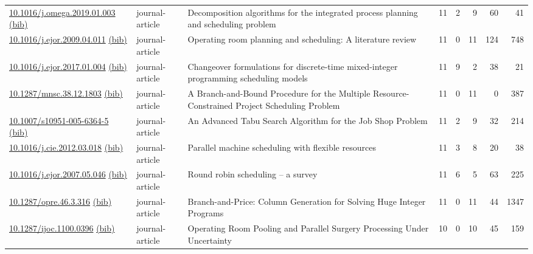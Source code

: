{\begin{longtable}{p{5cm}lp{11cm}rrrrr}
\href{http://dx.doi.org/10.1016/j.omega.2019.01.003}{10.1016/j.omega.2019.01.003} \href{https://www.doi2bib.org/bib/10.1016/j.omega.2019.01.003}{(bib)} & journal-article & Decomposition algorithms for the integrated process planning and scheduling problem & 11 & 2 & 9 & 60 & 41 \\
\href{http://dx.doi.org/10.1016/j.ejor.2009.04.011}{10.1016/j.ejor.2009.04.011} \href{https://www.doi2bib.org/bib/10.1016/j.ejor.2009.04.011}{(bib)} & journal-article & Operating room planning and scheduling: A literature review & 11 & 0 & 11 & 124 & 748 \\
\href{http://dx.doi.org/10.1016/j.ejor.2017.01.004}{10.1016/j.ejor.2017.01.004} \href{https://www.doi2bib.org/bib/10.1016/j.ejor.2017.01.004}{(bib)} & journal-article & Changeover formulations for discrete-time mixed-integer programming scheduling models & 11 & 9 & 2 & 38 & 21 \\
\href{http://dx.doi.org/10.1287/mnsc.38.12.1803}{10.1287/mnsc.38.12.1803} \href{https://www.doi2bib.org/bib/10.1287/mnsc.38.12.1803}{(bib)} & journal-article & A Branch-and-Bound Procedure for the Multiple Resource-Constrained Project Scheduling Problem & 11 & 0 & 11 & 0 & 387 \\
\href{http://dx.doi.org/10.1007/s10951-005-6364-5}{10.1007/s10951-005-6364-5} \href{https://www.doi2bib.org/bib/10.1007/s10951-005-6364-5}{(bib)} & journal-article & An Advanced Tabu Search Algorithm for the Job Shop Problem & 11 & 2 & 9 & 32 & 214 \\
\href{http://dx.doi.org/10.1016/j.cie.2012.03.018}{10.1016/j.cie.2012.03.018} \href{https://www.doi2bib.org/bib/10.1016/j.cie.2012.03.018}{(bib)} & journal-article & Parallel machine scheduling with flexible resources & 11 & 3 & 8 & 20 & 38 \\
\href{http://dx.doi.org/10.1016/j.ejor.2007.05.046}{10.1016/j.ejor.2007.05.046} \href{https://www.doi2bib.org/bib/10.1016/j.ejor.2007.05.046}{(bib)} & journal-article & Round robin scheduling – a survey & 11 & 6 & 5 & 63 & 225 \\
\href{http://dx.doi.org/10.1287/opre.46.3.316}{10.1287/opre.46.3.316} \href{https://www.doi2bib.org/bib/10.1287/opre.46.3.316}{(bib)} & journal-article & Branch-and-Price: Column Generation for Solving Huge Integer Programs & 11 & 0 & 11 & 44 & 1347 \\
\href{http://dx.doi.org/10.1287/ijoc.1100.0396}{10.1287/ijoc.1100.0396} \href{https://www.doi2bib.org/bib/10.1287/ijoc.1100.0396}{(bib)} & journal-article & Operating Room Pooling and Parallel Surgery Processing Under Uncertainty & 10 & 0 & 10 & 45 & 159 \\

\end{longtable}}
